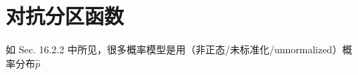 \chapter{对抗分区函数}
\label{chap:18}

如 Sec. 16.2.2 中所见，很多概率模型是用（非正态/未标准化/unnormalized）概率分布\(\widehat{p}\)